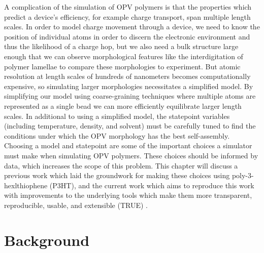 A complication of the simulation of OPV polymers is that the properties which predict a device's efficiency, for example charge transport, span multiple length scales.
In order to model charge movement through a device, we need to know the position of individual atoms in order to discern the electronic environment and thus the likelihood of a charge hop, but we also need a bulk structure large enough that we can observe morphological features like the interdigitation of polymer lamellae to compare these morphologies to experiment.
But atomic resolution at length scales of hundreds of nanometers becomes computationally expensive, so simulating larger morphologies necessitates a simplified model.
By simplifying our model using coarse-graining techniques where multiple atoms are represented as a single bead we can more efficiently equilibrate larger length scales.
In additional to using a simplified model, the statepoint variables (including temperature, density, and solvent) must be carefully tuned to find the conditions under which the OPV morphology has the best self-assembly. 
Choosing a model and statepoint are some of the important choices a simulator must make when simulating OPV polymers. 
These choices should be informed by data, which increases the scope of this problem.
This chapter will discuss a previous work which laid the groundwork for making these choices using poly-3-hexlthiophene (P3HT), and the current work which aims to reproduce this work with improvements to the underlying tools which make them more transparent, reproducible, usable, and extensible (TRUE) \citep{Thompson2020}.

\section{Background} 


